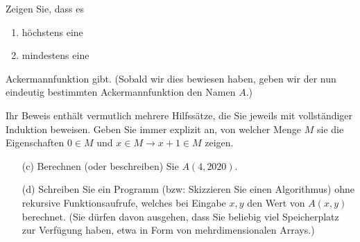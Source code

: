 
\begin{exercise}[207]

Zeigen Sie, dass es
\begin{enumerate}[label = (\alph*)]
	\item höchstens eine
	\item mindestens eine
\end{enumerate}
Ackermannfunktion gibt. (Sobald wir dies bewiesen haben, geben wir der nun eindeutig
bestimmten Ackermannfunktion den Namen $A$.)


Ihr Beweis enthält vermutlich mehrere Hilfssätze, die Sie jeweils mit vollständiger
Induktion beweisen. Geben Sie immer explizit an, von welcher Menge $M$ sie die
Eigenschaften $0 \in M$ und $x \in M \rightarrow x + 1 \in M$ zeigen.
\begin{itemize}
	\item[(c)] Berechnen (oder beschreiben) Sie $A(4,2020)$.
	\item[(d)] Schreiben Sie ein Programm (bzw: Skizzieren Sie einen Algorithmus)
	ohne rekursive Funktionsaufrufe, welches bei Eingabe $x,y$ den Wert von $A(x,y)$
	berechnet. (Sie dürfen davon ausgehen, dass Sie beliebig viel Speicherplatz zur
	Verfügung haben, etwa in Form von mehrdimensionalen Arrays.)
\end{itemize}
\end{exercise}


\begin{solution}

\phantom{}

\end{solution}
